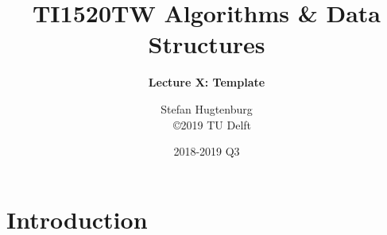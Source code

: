 

\title[Algorithms \& Data Structures]{TI1520TW Algorithms \& Data Structures}
\subtitle{\color{cyan} \textbf{Lecture X: Template}}
\author{Stefan Hugtenburg\\ {\tiny{\qquad~~\copyright 2019 TU Delft}}}
\date{2018-2019 Q3}



\frame{\titlepage}

\section{Introduction}





\frame{\titlepage}


